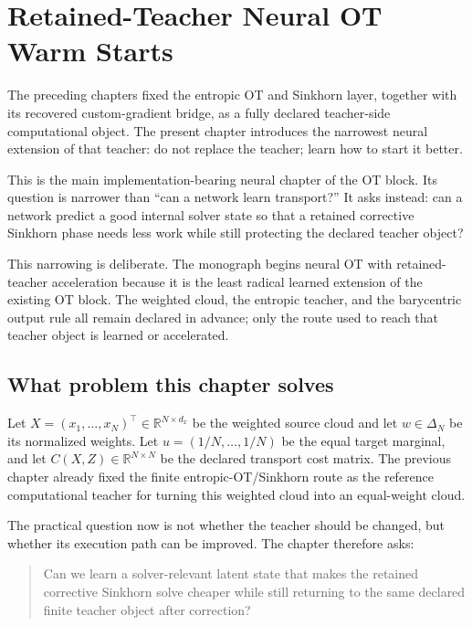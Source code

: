 \chapter{Retained-Teacher Neural OT Warm Starts}
\label{ch:bf-dpf-learned-ot}

The preceding chapters fixed the entropic OT and Sinkhorn layer, together with
its recovered custom-gradient bridge, as a fully declared teacher-side
computational object.  The present chapter introduces the narrowest neural
extension of that teacher: do not replace the teacher; learn how to start it
better.

This is the main implementation-bearing neural chapter of the OT block.  Its
question is narrower than ``can a network learn transport?''  It asks instead:
can a network predict a good internal solver state so that a retained corrective
Sinkhorn phase needs less work while still protecting the declared teacher
object?

This narrowing is deliberate.  The monograph begins neural OT with retained-
teacher acceleration because it is the least radical learned extension of the
existing OT block.  The weighted cloud, the entropic teacher, and the barycentric
output rule all remain declared in advance; only the route used to reach that
teacher object is learned or accelerated.

\section{What problem this chapter solves}
\label{sec:bf-learned-ot-objects}

Let \(X=(x_1,\ldots,x_N)^\top\in\mathbb R^{N\times d_x}\) be the weighted
source cloud and let \(w\in\Delta_N\) be its normalized weights.  Let
\(u=(1/N,\ldots,1/N)\) be the equal target marginal, and let
\(C(X,Z)\in\mathbb R^{N\times N}\) be the declared transport cost matrix.  The
previous chapter already fixed the finite entropic-OT/Sinkhorn route as the
reference computational teacher for turning this weighted cloud into an
equal-weight cloud.

The practical question now is not whether the teacher should be changed, but
whether its execution path can be improved.  The chapter therefore asks:
\begin{quote}
Can we learn a solver-relevant latent state that makes the retained corrective
Sinkhorn solve cheaper while still returning to the same declared finite teacher
object after correction?
\end{quote}

